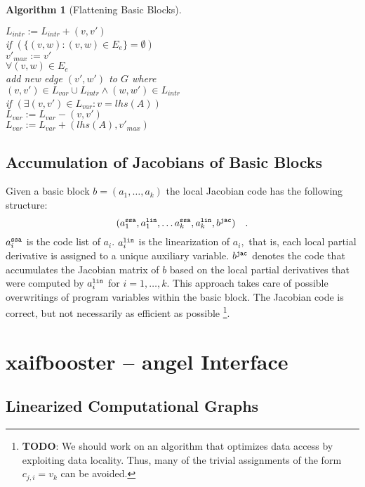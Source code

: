 \documentclass{book}
\newcommand{\todo}{{\bf TODO}}
\newtheorem{Alg}{Algorithm}
\begin{document}
\begin{Alg}[Flattening Basic Blocks]
\begin{tabbing}
\>\>\>\> $L_{intr}:=L_{intr}+(v,v')$\\
\>\>\> if $(\{(v,w):(v,w)\in E_e\}=\emptyset)$\\
\>\>\>\> $v'_{max}:=v'$\\
\> $\forall (v,w)\in E_e$ \\
\>\> add new edge $(v',w')$ to $G$ where \\
\>\> $(v,v') \in L_{var}\cup L_{intr} \wedge (w,w') \in L_{intr}$ \\
\> if $(\exists (v,v') \in L_{var}:v=lhs(A))$ \\
\>\> $L_{var}:=L_{var}-(v,v')$\\
\> $L_{var}:=L_{var}+(lhs(A),v'_{max})$\\
\end{tabbing}
\end{Alg}


\section{Accumulation of Jacobians of Basic Blocks}
\label{sec:jac_code_gen_bb}

Given a basic block $b=(a_1,\ldots,a_k)$ the local Jacobian code
has the following structure:
$$
(a_1^{\tt ssa}, a_1^{\tt lin}, \ldots
a_k^{\tt ssa}, a_k^{\tt lin}, b^{\tt jac}) \quad .$$
$a_i^{\tt ssa}$ is the code list of $a_i.$
$a_i^{\tt lin}$ is the linearization of $a_i,$ that is, each
local partial derivative is assigned to a unique auxiliary variable.
$b^{\tt jac}$ denotes the code that accumulates the Jacobian matrix of
$b$ based on the local partial derivatives that were computed by
$a_i^{\tt lin}$ for $i=1,\ldots,k.$ This approach takes care of possible
overwritings of program variables within the basic block. The Jacobian
code is correct, but not necessarily as efficient as possible
\footnote{\todo: We should work on an algorithm that optimizes
data access by exploiting data locality. Thus, many of the trivial
assignments of the form $c_{j,i}=v_k$ can be avoided.}.

\chapter{xaifbooster -- angel Interface}

\section{Linearized Computational Graphs}
\end{document}
